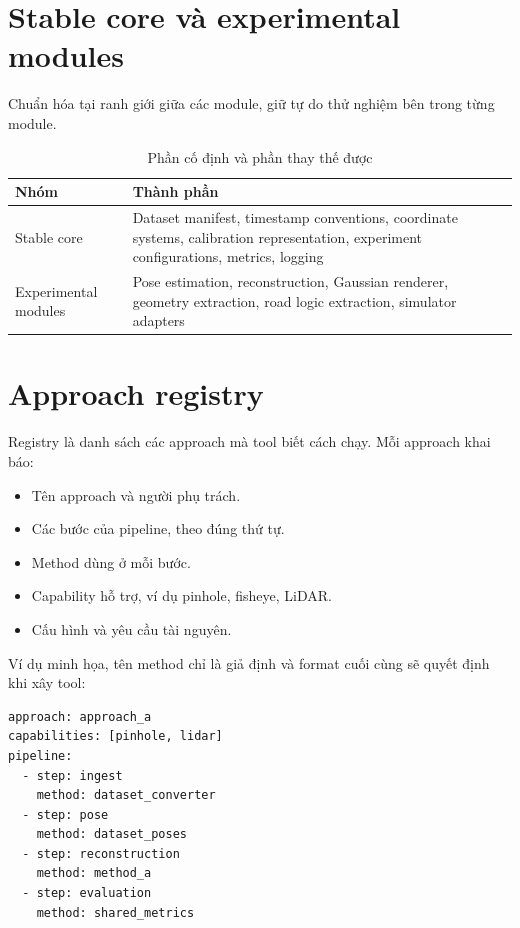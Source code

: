 \section{Stable core và experimental modules}

Chuẩn hóa tại ranh giới giữa các module, giữ tự do thử nghiệm bên trong từng module.

\begin{table}[H]
  \centering
  \caption{Phần cố định và phần thay thế được}
  \begin{tabularx}{\linewidth}{l X}
    \toprule
    \textbf{Nhóm} & \textbf{Thành phần} \\
    \midrule
    Stable core & Dataset manifest, timestamp conventions, coordinate systems, calibration representation, experiment configurations, metrics, logging \\
    \addlinespace
    Experimental modules & Pose estimation, reconstruction, Gaussian renderer, geometry extraction, road logic extraction, simulator adapters \\
    \bottomrule
  \end{tabularx}
\end{table}

\section{Approach registry}

Registry là danh sách các approach mà tool biết cách chạy. Mỗi approach khai báo:
\begin{itemize}
  \item Tên approach và người phụ trách.
  \item Các bước của pipeline, theo đúng thứ tự.
  \item Method dùng ở mỗi bước.
  \item Capability hỗ trợ, ví dụ pinhole, fisheye, LiDAR.
  \item Cấu hình và yêu cầu tài nguyên.
\end{itemize}

Ví dụ minh họa, tên method chỉ là giả định và format cuối cùng sẽ quyết định khi xây tool:

\begin{lstlisting}[numbers=none, caption={Ví dụ khai báo một approach}]
approach: approach_a
capabilities: [pinhole, lidar]
pipeline:
  - step: ingest
    method: dataset_converter
  - step: pose
    method: dataset_poses
  - step: reconstruction
    method: method_a
  - step: evaluation
    method: shared_metrics
\end{lstlisting}

